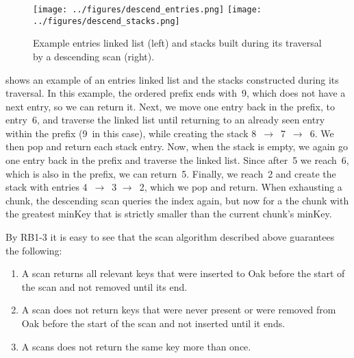 \begin{figure}[tb]
\centering
\texttt{[image: ../figures/descend\_entries.png]}
\hspace{5mm}
\texttt{[image: ../figures/descend\_stacks.png]}
\caption{Example entries linked list (left) and stacks built during its traversal by a descending scan (right).}
\label{fig:descend}
\end{figure}

 shows an example of an entries linked list and the stacks constructed during its traversal.
In this example, the ordered prefix ends with~9, which does not have a next entry, so we  can return it.
Next, we move one entry back in the prefix, to entry~6, and traverse the linked list until returning to an already seen entry within the prefix (9~in this case), 
while creating the stack 8~$\rightarrow{}$~7~$\rightarrow{}$~6. 
We then pop and return each stack entry.
Now, when the stack is empty, we again go one entry back in the prefix and traverse the linked list. Since after~5 we reach~6, which is also in the prefix, we can return~5. 
Finally, we reach~2 and create the stack with entries 4~$\rightarrow{}$~3 $\rightarrow{}$~2, which we pop and return. 
When exhausting a chunk, the descending  scan queries the index again, but now for a the chunk with the greatest minKey that is strictly smaller than the current chunk's minKey.


\newenvironment{enum}%
  {\begin{enumerate}%
      \setlength{\partopsep}{0pt}%
      \setlength{\topsep}{0pt}%
    \setlength{\itemsep}{0pt}%
    \setlength{\parsep}{0pt}}%
  {\end{enumerate}}

By RB1-3 it is easy to see that the scan algorithm described above guarantees the following:
\begin{enumerate} 
    \item A scan returns all relevant keys that were inserted to Oak before the start of the scan and not removed until its end.
    \item A scan does not return keys that were never present or were removed from Oak before the start of the scan and not inserted until it ends.
    \item A scans does not return the same key more than once.
\end{enumerate}

